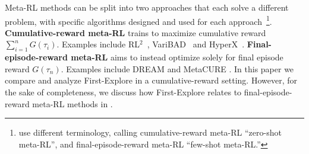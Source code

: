 \documentclass{article}
\begin{document}
Meta-RL methods can be split into two approaches that each solve a different problem, with specific algorithms designed and used for each approach~\citep{beck2023survey}\footnote{\cite{beck2023survey} use different terminology, calling cumulative-reward meta-RL ``zero-shot meta-RL'', and final-episode-reward meta-RL ``few-shot meta-RL.''}. \textbf{Cumulative-reward meta-RL} trains to maximize cumulative reward \(\sum_{i=1}^n G(\tau_i)\). Examples include RL\(^2\)~\cite{rl2, rl2alt}, VariBAD~\cite{VariBAD} and HyperX~\cite{hyperx}. \textbf{Final-episode-reward meta-RL} aims to instead optimize solely for final episode reward \(G(\tau_n)\). Examples include DREAM \citep{liu2021decoupling} and MetaCURE \citep{metacure}. In this paper we compare and analyze First-Explore in a cumulative-reward setting. However, for the sake of completeness, we discuss how First-Explore relates to final-episode-reward meta-RL methods in .
\end{document}
